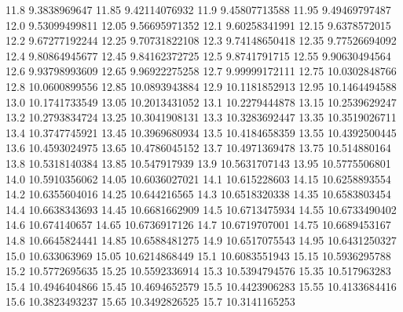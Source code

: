            11.8     9.3838969647
          11.85    9.42114076932
           11.9    9.45807713588
          11.95    9.49469797487
           12.0    9.53099499811
          12.05    9.56695971352
           12.1    9.60258341991
          12.15     9.6378572015
           12.2    9.67277192244
          12.25    9.70731822108
           12.3    9.74148650418
          12.35    9.77526694092
           12.4    9.80864945677
          12.45    9.84162372725
           12.5     9.8741791715
          12.55    9.90630494564
           12.6    9.93798993609
          12.65    9.96922275258
           12.7    9.99999172111
          12.75    10.0302848766
           12.8    10.0600899556
          12.85    10.0893943884
           12.9    10.1181852913
          12.95    10.1464494588
           13.0    10.1741733549
          13.05    10.2013431052
           13.1    10.2279444878
          13.15    10.2539629247
           13.2    10.2793834724
          13.25    10.3041908131
           13.3    10.3283692447
          13.35    10.3519026711
           13.4    10.3747745921
          13.45    10.3969680934
           13.5    10.4184658359
          13.55    10.4392500445
           13.6    10.4593024975
          13.65    10.4786045152
           13.7    10.4971369478
          13.75     10.514880164
           13.8    10.5318140384
          13.85     10.547917939
           13.9    10.5631707143
          13.95    10.5775506801
           14.0    10.5910356062
          14.05    10.6036027021
           14.1     10.615228603
          14.15    10.6258893554
           14.2    10.6355604016
          14.25     10.644216565
           14.3    10.6518320338
          14.35    10.6583803454
           14.4    10.6638343693
          14.45    10.6681662909
           14.5    10.6713475934
          14.55    10.6733490402
           14.6     10.674140657
          14.65    10.6736917126
           14.7    10.6719707001
          14.75    10.6689453167
           14.8    10.6645824441
          14.85    10.6588481275
           14.9    10.6517075543
          14.95    10.6431250327
           15.0     10.633063969
          15.05    10.6214868449
           15.1    10.6083551943
          15.15    10.5936295788
           15.2    10.5772695635
          15.25    10.5592336914
           15.3    10.5394794576
          15.35     10.517963283
           15.4    10.4946404866
          15.45    10.4694652579
           15.5    10.4423906283
          15.55    10.4133684416
           15.6    10.3823493237
          15.65    10.3492826525
           15.7    10.3141165253
